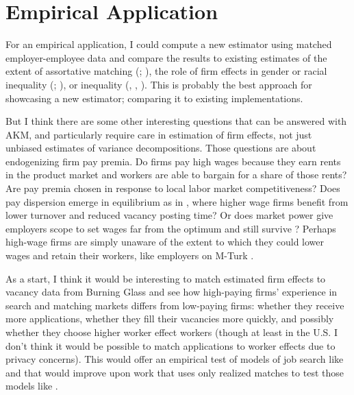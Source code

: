 \documentclass{article}
\begin{document}
\section{Empirical Application}

For an empirical application, I could compute a new estimator using matched employer-employee data and compare the results to existing estimates of the extent of assortative matching (\citealp{kline2020leave}; \citealp{bonhomme2022discretizing}), the role of firm effects in gender or racial inequality (\citealp{card2016bargaining}; \citealp{gerard2021assortative}), or inequality (\citealp{card2013workplace}, \citealp{song2019firming}, \citealp{wilmers2021consolidated}). This is probably the best approach for showcasing a new estimator; comparing it to existing implementations.

But I think there are some other interesting questions that can be answered with AKM, and particularly require care in estimation of firm effects, not just unbiased estimates of variance decompositions. Those questions are about endogenizing firm pay premia. Do firms pay high wages because they earn rents in the product market and workers are able to bargain for a share of those rents? Are pay premia chosen in response to local labor market competitiveness? Does pay dispersion emerge in equilibrium as in \citet{burdett1998wage}, where higher wage firms benefit from lower turnover and reduced vacancy posting time? Or does market power give employers scope to set wages far from the optimum and still survive \citep{dube2018monopsony}? Perhaps high-wage firms are simply unaware of the extent to which they could lower wages and retain their workers, like employers on M-Turk \citep{dube2020monopsony}.

As a start, I think it would be interesting to match estimated firm effects to vacancy data from Burning Glass and see how high-paying firms' experience in search and matching markets differs from low-paying firms: whether they receive more applications, whether they fill their vacancies more quickly, and possibly whether they choose higher worker effect workers (though at least in the U.S. I don't think it would be possible to match applications to worker effects due to privacy concerns). This would offer an empirical test of models of job search like \citet{burdett1998wage} and \citet{postel2002equilibrium} that would improve upon work that uses only realized matches to test those models like \citet{di2021ain}.

\newpage


\end{document}
